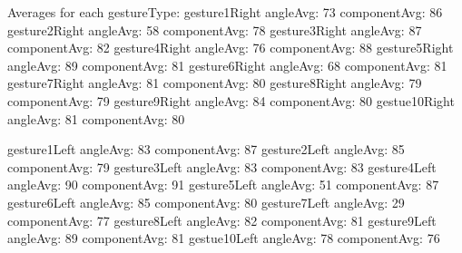 Averages for each gestureType:
gesture1Right angleAvg: 73 componentAvg: 86
gesture2Right angleAvg: 58 componentAvg: 78
gesture3Right angleAvg: 87 componentAvg: 82
gesture4Right angleAvg: 76 componentAvg: 88
gesture5Right angleAvg: 89 componentAvg: 81
gesture6Right angleAvg: 68 componentAvg: 81
gesture7Right angleAvg: 81 componentAvg: 80
gesture8Right angleAvg: 79 componentAvg: 79
gesture9Right angleAvg: 84 componentAvg: 80
gestue10Right angleAvg: 81 componentAvg: 80

gesture1Left angleAvg: 83 componentAvg: 87
gesture2Left angleAvg: 85 componentAvg: 79
gesture3Left angleAvg: 83 componentAvg: 83
gesture4Left angleAvg: 90 componentAvg: 91
gesture5Left angleAvg: 51 componentAvg: 87
gesture6Left angleAvg: 85 componentAvg: 80
gesture7Left angleAvg: 29 componentAvg: 77
gesture8Left angleAvg: 82 componentAvg: 81
gesture9Left angleAvg: 89 componentAvg: 81
gestue10Left angleAvg: 78 componentAvg: 76
